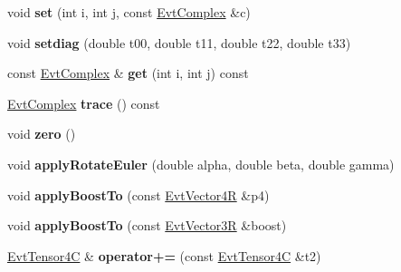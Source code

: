 \begin{DoxyCompactItemize}
\item 
\hypertarget{class_evt_tensor4_c_a384ec7ecaa37d8ec9e939ed56658a638}{}void {\bfseries set} (int i, int j, const \hyperlink{class_evt_complex}{Evt\+Complex} \&c)\label{class_evt_tensor4_c_a384ec7ecaa37d8ec9e939ed56658a638}

\item 
\hypertarget{class_evt_tensor4_c_a1e756b6c97ea40d74dda04d186a2b496}{}void {\bfseries setdiag} (double t00, double t11, double t22, double t33)\label{class_evt_tensor4_c_a1e756b6c97ea40d74dda04d186a2b496}

\item 
\hypertarget{class_evt_tensor4_c_a7736bdaea22f30c799fb275bb8a94df0}{}const \hyperlink{class_evt_complex}{Evt\+Complex} \& {\bfseries get} (int i, int j) const \label{class_evt_tensor4_c_a7736bdaea22f30c799fb275bb8a94df0}

\item 
\hypertarget{class_evt_tensor4_c_a5497e55acee2f0c89c3eb829db93e5bd}{}\hyperlink{class_evt_complex}{Evt\+Complex} {\bfseries trace} () const \label{class_evt_tensor4_c_a5497e55acee2f0c89c3eb829db93e5bd}

\item 
\hypertarget{class_evt_tensor4_c_a34ab97f785af90cb18d517a33728b287}{}void {\bfseries zero} ()\label{class_evt_tensor4_c_a34ab97f785af90cb18d517a33728b287}

\item 
\hypertarget{class_evt_tensor4_c_ae0bd1af45c6dff5d16b9afb82a77b7c8}{}void {\bfseries apply\+Rotate\+Euler} (double alpha, double beta, double gamma)\label{class_evt_tensor4_c_ae0bd1af45c6dff5d16b9afb82a77b7c8}

\item 
\hypertarget{class_evt_tensor4_c_a6a2bc6666fb1e7bbb80c940a5064bead}{}void {\bfseries apply\+Boost\+To} (const \hyperlink{class_evt_vector4_r}{Evt\+Vector4\+R} \&p4)\label{class_evt_tensor4_c_a6a2bc6666fb1e7bbb80c940a5064bead}

\item 
\hypertarget{class_evt_tensor4_c_a15e3c58236766519be93090ed6a3435a}{}void {\bfseries apply\+Boost\+To} (const \hyperlink{class_evt_vector3_r}{Evt\+Vector3\+R} \&boost)\label{class_evt_tensor4_c_a15e3c58236766519be93090ed6a3435a}

\item 
\hypertarget{class_evt_tensor4_c_ad0b0ca0ded8abaa1557b8bf12d1387cf}{}\hyperlink{class_evt_tensor4_c}{Evt\+Tensor4\+C} \& {\bfseries operator+=} (const \hyperlink{class_evt_tensor4_c}{Evt\+Tensor4\+C} \&t2)\label{class_evt_tensor4_c_ad0b0ca0ded8abaa1557b8bf12d1387cf}


\end{DoxyCompactItemize}
